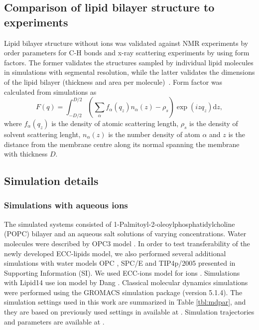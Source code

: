 \documentclass[aip,jcp,twocolumn]{revtex4}
\begin{document}
\subsection{Comparison of lipid bilayer structure to experiments}

Lipid bilayer structure without ions was validated against NMR experiments
by order parameters for C-H bonds and x-ray scattering experiments by using
form factors. The former validates the structures sampled by individual
lipid molecules in simulations with segmental resolution, while the latter
validates the dimensions of the lipid bilayer (thickness and area per
molecule)~\cite{ollila16}. Form factor was calculated from simulations
as 
\begin{equation}
  F(q) = \int _{-D/2} ^{D/2} \left ( \sum _\alpha f_\alpha (q_z) n_\alpha (z) - \rho _s \right ) \exp (izq_z) \mathrm{d}z,
\end{equation}
where $f_\alpha(q_z)$ is the density of atomic scattering length, 
$\rho_s$ is the density of solvent scattering lenght,
$n_\alpha (z)$ is the number density of atom $\alpha$ and
$z$ is the distance from the membrane centre along its normal 
spanning the membrane with thickness $D$. 




\subsection{Simulation details}

\subsubsection{Simulations with aqueous ions}
The simulated systems consisted of 1-Palmitoyl-2-oleoylphosphatidylcholine
(POPC) bilayer and an aqueous salt solutions of varying concentrations.
Water molecules were described by OPC3 model \cite{Izadi16}.
In order to test transferability of the newly developed ECC-lipids model, 
we also performed several additional simulations with water models 
OPC \cite{Izadi14}, SPC/E \cite{Berendsen1987} and TIP4p/2005 \cite{Abascal2005}
presented in Supporting Information (SI). 
We used ECC-ions model for ions \cite{jungwirth17-new-paper-to-be-published, kohagen16, Pluharova2014}.  %
Simulations with Lipid14 use ion model by Dang \cite{smith94,chang1999,dang2006}. 
Classical molecular dynamics simulations were performed using the GROMACS \cite{Abraham15} simulation package (version 5.1.4).  
The simulation settings used in this work are 
summarized in Table \ref{tbl:mdpar}, 
and they are based on previously used settings in \cite{catte16} available at \cite{lipid14POPC0mMNaClfiles}. 
Simulation trajectories and parameters are available at \cite{??} .
\end{document}
